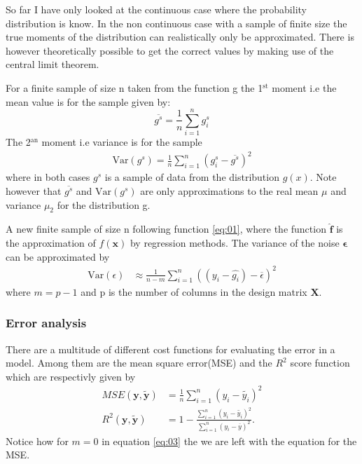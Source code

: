 \documentclass[uio,jmp,amsmath,amssymb,reprint,nofootinbib]{revtex4-1}
\numberwithin{equation}{section}
\begin{document}
So far I have only looked at the continuous case where the probability distribution is know. In the non continuous case with a sample of finite size the true moments of the distribution can realistically only be approximated. There is however theoretically possible to get the correct values by making use of the central limit theorem.

For a finite sample of size n taken from the function g the 1\(^\text{st}\) moment i.e the mean value is for the sample given by:
\begin{equation}\label{eq:02}
    \overline{g^s} = \frac{1}{n}\sum_{i=1}^n g_i^s
\end{equation}
The 2\(^\text{an}\) moment i.e variance is for the sample
\begin{align}\label{eq:03}
    \text{Var}(g^s) = \frac{1}{n}\sum_{i=1}^n (g^s_i - \overline{g^s})^2
\end{align}
where in both cases \(g^s\) is a sample of data from the distribution \(g(x)\). Note however that \(\overline{g^s}\) and \(\text{Var}(g^s)\) are only approximations to the real mean \(\mu\) and variance \(\mu_2\) for the distribution g.

A new finite sample of size n following function \ref{eq:01}, where the function \(\bm{\hat{f}}\) is the approximation of \(f(\bm{x})\) by regression methods. The variance of the noise \(\bm{\epsilon}\) can be approximated by
\begin{align}
    \text{Var}(\epsilon) &\approx \frac{1}{n - m}\sum_{i=1}^n ((y_i - \hat{g_i}) - \overline{\epsilon})^2
\end{align}
where \(m = p-1\) and p is the number of columns in the design matrix \(\bm{X}\).

\subsubsection{Error analysis}

There are a multitude of different cost functions for evaluating the error in a model. Among them are the mean square error(MSE) and the \(R^2\) score function which are respectivly given by
\begin{align}\label{eq:05}
    MSE(\bm{y}, \bm{\tilde{y}}) &= \frac{1}{n}\sum_{i=1}^n(y_i - \tilde{y_i})^2\\ \label{eq:11}
    R^2(\bm{y}, \bm{\tilde{y}}) &= 1 - \frac{\sum_{i=1}^n(y_i - \tilde{y_i})^2}{\sum_{i=1}^n(y_i - \overline{y})^2}. 
\end{align}
Notice how for \(m=0\) in equation \ref{eq:03} the we are left with the equation for the MSE.
\end{document}
